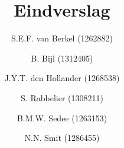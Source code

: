 \documentclass{article}
\title{\casamproject Eindverslag}
\author{S.E.F. van Berkel (1262882) \and B. Bijl (1312405)\and J.Y.T. den Hollander (1268538)\and S. Rabbelier (1308211)\and B.M.W. Sedee (1263153)\and N.N. Smit (1286455)}
\begin{document}
\begin{titlepage}

\maketitle

\thispagestyle{empty}

\end{titlepage}

\setcounter{page}{2}
\setcounter{tocdepth}{2}

\tableofcontents

\newpage
\noindent


\newpage

\newpage

\newpage

\newpage

\newpage

\newpage

\newpage

\newpage




\newpage




\end{document}
